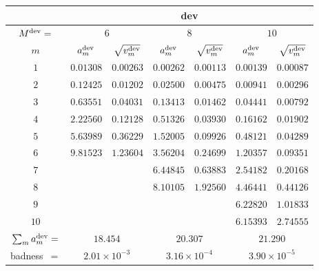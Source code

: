 \begin{tabular}{c|cc|cc|cc|}
&
\multicolumn{6}{|c|}{dev} \\
\hline
$M^{\mathrm{dev}}=$ &
 \multicolumn{2}{|c|}{$6$} &
 \multicolumn{2}{|c|}{$8$} &
 \multicolumn{2}{|c|}{$10$} \\
$m$ &
 $a^{\mathrm{dev}}_m$ & $\sqrt{v^{\mathrm{dev}}_m}$ &
 $a^{\mathrm{dev}}_m$ & $\sqrt{v^{\mathrm{dev}}_m}$ &
 $a^{\mathrm{dev}}_m$ & $\sqrt{v^{\mathrm{dev}}_m}$ \\
$1$ &
 $0.01308$ & $0.00263$ &
 $0.00262$ & $0.00113$ &
 $0.00139$ & $0.00087$ \\
$2$ &
 $0.12425$ & $0.01202$ &
 $0.02500$ & $0.00475$ &
 $0.00941$ & $0.00296$ \\
$3$ &
 $0.63551$ & $0.04031$ &
 $0.13413$ & $0.01462$ &
 $0.04441$ & $0.00792$ \\
$4$ &
 $2.22560$ & $0.12128$ &
 $0.51326$ & $0.03930$ &
 $0.16162$ & $0.01902$ \\
$5$ &
 $5.63989$ & $0.36229$ &
 $1.52005$ & $0.09926$ &
 $0.48121$ & $0.04289$ \\
$6$ &
 $9.81523$ & $1.23604$ &
 $3.56204$ & $0.24699$ &
 $1.20357$ & $0.09351$ \\
$7$ &
 $~$ & $~$ &
 $6.44845$ & $0.63883$ &
 $2.54182$ & $0.20168$ \\
$8$ &
 $~$ & $~$ &
 $8.10105$ & $1.92560$ &
 $4.46441$ & $0.44126$ \\
$9$ &
 $~$ & $~$ &
 $~$ & $~$ &
 $6.22820$ & $1.01833$ \\
$10$ &
 $~$ & $~$ &
 $~$ & $~$ &
 $6.15393$ & $2.74555$ \\
\hline
$\sum_m a^{\mathrm{dev}}_m=$ &
 \multicolumn{2}{|c|}{$18.454$} &
 \multicolumn{2}{|c|}{$20.307$} &
 \multicolumn{2}{|c|}{$21.290$} \\
badness~$=$ &
 \multicolumn{2}{|c|}{$2.01\times 10^{-3}$} &
 \multicolumn{2}{|c|}{$3.16\times 10^{-4}$} &
 \multicolumn{2}{|c|}{$3.90\times 10^{-5}$} \\
\end{tabular}
